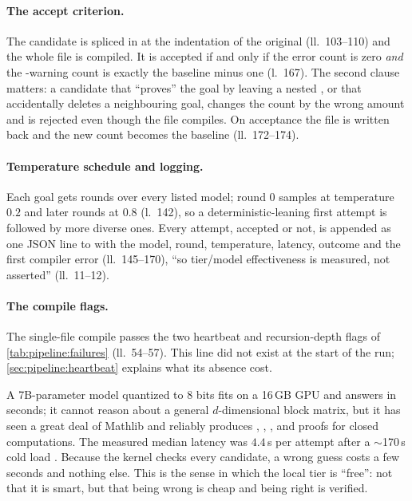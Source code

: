 \paragraph{The accept criterion.} The candidate is spliced in at the indentation of the
original  (ll.~103--110) and the whole file is compiled. It is accepted if and
only if the error count is zero \emph{and} the -warning count is exactly the
baseline minus one (l.~167). The second clause matters: a candidate that ``proves'' the goal
by leaving a nested , or that accidentally deletes a neighbouring goal, changes
the count by the wrong amount and is rejected even though the file compiles. On acceptance
the file is written back and the new count becomes the baseline (ll.~172--174).

\paragraph{Temperature schedule and logging.} Each goal gets  rounds over
every listed model; round 0 samples at temperature $0.2$ and later rounds at $0.8$
(l.~142), so a deterministic-leaning first attempt is followed by more diverse ones. Every
attempt, accepted or not, is appended as one JSON line to
 with the model, round, temperature, latency,
outcome and the first compiler error (ll.~145--170), ``so tier/model effectiveness is
measured, not asserted'' (ll.~11--12).

\paragraph{The compile flags.} The single-file compile passes the two heartbeat and
recursion-depth flags of \cref{tab:pipeline:failures} (ll.~54--57). This line did not
exist at the start of the run; \cref{sec:pipeline:heartbeat} explains what its absence
cost.

\begin{physicsbox}
A 7B-parameter model quantized to 8 bits fits on a 16\,GB GPU and answers in seconds; it
cannot reason about a general $d$-dimensional block matrix, but it has seen a great deal of
Mathlib and reliably produces , , , and  proofs for closed computations. The measured median latency was
$4.4$\,s per attempt after a $\sim$170\,s cold load . Because the kernel checks every candidate, a wrong guess costs a few seconds and
nothing else. This is the sense in which the local tier is ``free'': not that it is
smart, but that being wrong is cheap and being right is verified.
\end{physicsbox}

